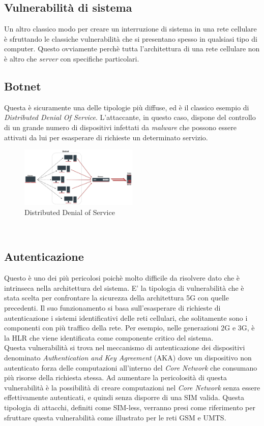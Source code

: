 \subsection{Vulnerabilità di sistema}
Un altro classico modo per creare un interruzione di sistema in una rete cellulare è sfruttando le classiche vulnerabilità che si presentano spesso in qualsiasi tipo di computer.
Questo ovviamente perchè tutta l'architettura di una rete cellulare non è altro che \textit{server} con specifiche particolari.

\clearpage

\subsection{Botnet}
Questa è sicuramente una delle tipologie più diffuse, ed è il classico esempio di \textit{Distributed Denial Of Service}. L'attaccante, in questo caso, dispone del controllo di 
un grande numero di dispositivi infettati da \textit{malware} che possono essere attivati da lui per esasperare di richieste un determinato servizio.
\begin{figure}[h]
    \centering
    \includegraphics[width=0.5\textwidth]{images/ddos.jpg}
    \caption{Distributed Denial of Service}
\end{figure}\\

\subsection{Autenticazione}
Questo è uno dei più pericolosi poichè molto difficile da risolvere dato che è intrinseca nella architettura del sistema.
E' la tipologia di vulnerabilità che è stata scelta per confrontare la sicurezza della architettura 5G con quelle precedenti.
Il suo funzionamento si basa sull'esasperare di richieste di autenticazione i sistemi identificativi delle reti cellulari, che solitamente 
sono i componenti con più traffico della rete. Per esempio, nelle generazioni 2G e 3G, è la HLR che viene identificata come componente critico del
sistema.\\
Questa vulnerabilità si trova nel meccanismo di autenticazione dei dispositivi denominato \textit{Authentication and Key Agreement} (AKA) dove un dispositivo
non autenticato forza delle computazioni all'interno del \textit{Core Network} che consumano più risorse della richiesta stessa\cite{umts-dos}.
Ad aumentare la pericolosità di questa vulnerabilità è la possibilità di creare computazioni nel \textit{Core Network} senza essere effettivamente autenticati, e quindi 
senza disporre di una SIM valida. Questa tipologia di attacchi, definiti come SIM-less, verranno presi come riferimento per sfruttare questa vulnerabilità come illustrato per le 
reti GSM\cite{gsm-dos-simless} e UMTS\cite{umts-dos}.

